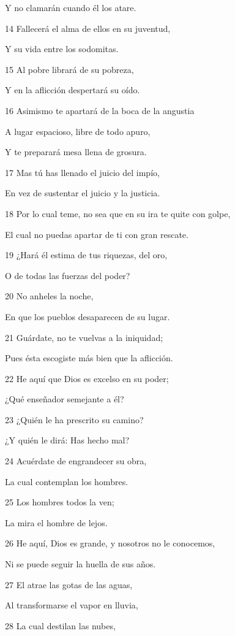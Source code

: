 \par Y no clamarán cuando él los atare.
\par 14 Fallecerá el alma de ellos en su juventud,
\par Y su vida entre los sodomitas.
\par 15 Al pobre librará de su pobreza,
\par Y en la aflicción despertará su oído.
\par 16 Asimismo te apartará de la boca de la angustia
\par A lugar espacioso, libre de todo apuro,
\par Y te preparará mesa llena de grosura.
\par 17 Mas tú has llenado el juicio del impío,
\par En vez de sustentar el juicio y la justicia.
\par 18 Por lo cual teme, no sea que en su ira te quite con golpe,
\par El cual no puedas apartar de ti con gran rescate. 
\par 19 ¿Hará él estima de tus riquezas, del oro,
\par O de todas las fuerzas del poder?
\par 20 No anheles la noche,
\par En que los pueblos desaparecen de su lugar.
\par 21 Guárdate, no te vuelvas a la iniquidad;
\par Pues ésta escogiste más bien que la aflicción.
\par 22 He aquí que Dios es excelso en su poder;
\par ¿Qué enseñador semejante a él?
\par 23 ¿Quién le ha prescrito su camino?
\par ¿Y quién le dirá: Has hecho mal?
\par 24 Acuérdate de engrandecer su obra,
\par La cual contemplan los hombres.
\par 25 Los hombres todos la ven;
\par La mira el hombre de lejos.
\par 26 He aquí, Dios es grande, y nosotros no le conocemos,
\par Ni se puede seguir la huella de sus años.
\par 27 El atrae las gotas de las aguas,
\par Al transformarse el vapor en lluvia,
\par 28 La cual destilan las nubes,
